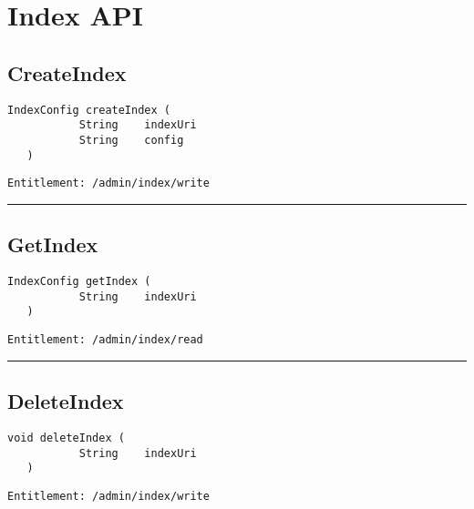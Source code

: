 \chapter{Index API}

\section{CreateIndex}
\label{Api:CreateIndex}
\begin{lstlisting}[style=nonumbers]
   IndexConfig createIndex (
           String    indexUri
           String    config
   )
\end{lstlisting}
\begin{Verbatim}[formatcom=\color{Maroon}]
  Entitlement: /admin/index/write
\end{Verbatim}



\rule{12cm}{2pt}
\section{GetIndex}
\label{Api:GetIndex}
\begin{lstlisting}[style=nonumbers]
   IndexConfig getIndex (
           String    indexUri
   )
\end{lstlisting}
\begin{Verbatim}[formatcom=\color{Maroon}]
  Entitlement: /admin/index/read
\end{Verbatim}



\rule{12cm}{2pt}
\section{DeleteIndex}
\label{Api:DeleteIndex}
\begin{lstlisting}[style=nonumbers]
   void deleteIndex (
           String    indexUri
   )
\end{lstlisting}
\begin{Verbatim}[formatcom=\color{Maroon}]
  Entitlement: /admin/index/write
\end{Verbatim}



